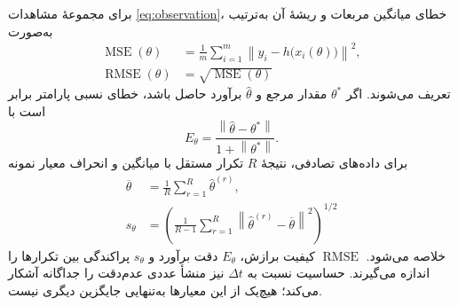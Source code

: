 برای مجموعهٔ مشاهدات \eqref{eq:observation}، خطای میانگین مربعات و ریشهٔ آن به‌ترتیب به‌صورت
\begin{align}
  \operatorname{MSE}(\theta)
  &=\frac{1}{m}\sum_{i=1}^{m}
  \left\lVert y_i-h\bigl(x_i(\theta)\bigr)\right\rVert^2, \\
  \operatorname{RMSE}(\theta)
  &=\sqrt{\operatorname{MSE}(\theta)}
  \label{eq:rmse}
\end{align}
تعریف می‌شوند. اگر $\theta^{\ast}$ مقدار مرجع و $\widehat{\theta}$ برآورد حاصل باشد، خطای نسبی پارامتر برابر است با
\begin{equation}
  E_{\theta}=
  \frac{\left\lVert\widehat{\theta}-\theta^{\ast}\right\rVert}
  {1+\left\lVert\theta^{\ast}\right\rVert}.
  \label{eq:relative-parameter-error}
\end{equation}
برای داده‌های تصادفی، نتیجهٔ $R$ تکرار مستقل با میانگین و انحراف معیار نمونه
\begin{align}
  \overline{\theta}
  &=\frac{1}{R}\sum_{r=1}^{R}\widehat{\theta}^{(r)}, \\
  s_{\theta}
  &=\left(
  \frac{1}{R-1}\sum_{r=1}^{R}
  \left\lVert\widehat{\theta}^{(r)}-\overline{\theta}\right\rVert^2
  \right)^{1/2}
  \label{eq:replicate-summary}
\end{align}
خلاصه می‌شود. $\operatorname{RMSE}$ کیفیت برازش، $E_{\theta}$ دقت برآورد و $s_{\theta}$ پراکندگی بین تکرارها را اندازه می‌گیرند. حساسیت نسبت به $\Delta t$ نیز منشأ عددی عدم‌دقت را جداگانه آشکار می‌کند؛ هیچ‌یک از این معیارها به‌تنهایی جایگزین دیگری نیست.
